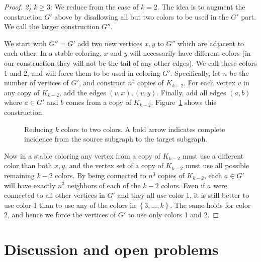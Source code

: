 \begin{proof}
\noindent \emph{2)} $k\ge3$:
We reduce from the case of $k=2$. The idea is to augment the
construction $G'$ above by disallowing all but two colors to be used in the
$G'$ part. We call the larger construction $G''$. 

We start with $G'' = G'$ add two new vertices $x,y$ to $G''$ which are
adjacent to each other. In a stable coloring, $x$ and $y$ will necessarily have
different colors (in our construction they will not be the tail of any other
edges). We call these colors 1 and 2, and will force them to be used in
coloring $G'$.
Specifically, let $n$ be the number of vertices of $G'$, and construct
$n^3$ copies of $K_{k-2}$. For each vertex $v$ in any copy of $K_{k-2}$, add
the edges $(v,x), (v,y)$. Finally, add all edges $(a,b)$ where $a \in G'$ and
$b$ comes from a copy of $K_{k-2}$. Figure~\ref{weakkcolornphard} shows this
construction. 

\begin{figure}[htb]
\centering
{}
\caption{Reducing $k$ colors to two colors. A bold arrow indicates complete
incidence from the source subgraph to the target subgraph.}
\label{weakkcolornphard}
\end{figure}

Now in a stable coloring any vertex from a copy of $K_{k-2}$ must use a
different color than both $x,y$, and the vertex set of a copy of $K_{k-2}$ must
use all possible remaining $k-2$ colors. By being connected to $n^3$ copies of
$K_{k-2}$, each $a \in G'$ will have exactly $n^3$ neighbors of each of the
$k-2$ colors. Even if $a$ were connected to all other vertices in $G'$ and they
all use color 1, it is still better to use color 1 than to use any of the
colors in $\left \{ 3, \dots, k \right \}$. The same holds for color 2, and
hence we force the vertices of $G'$ to use only colors 1 and 2.  
\end{proof}

\section{Discussion and open problems}

